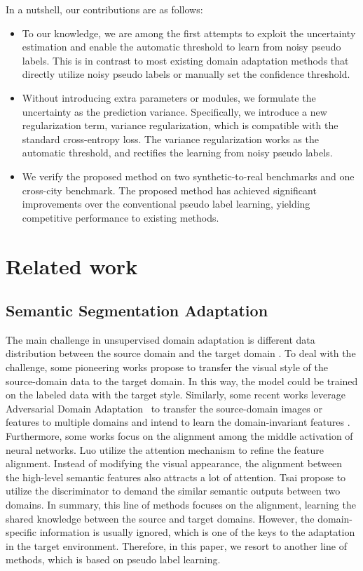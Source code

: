 In a nutshell, our contributions are as follows:
\begin{itemize}
\item To our knowledge, we are among the first attempts to exploit the uncertainty estimation and enable the automatic threshold to learn from noisy pseudo labels. This is in contrast to most existing domain adaptation methods that directly utilize noisy pseudo labels or manually set the confidence threshold. 
\item Without introducing extra parameters or modules, we formulate the uncertainty as the prediction variance. Specifically, we introduce a new regularization term, variance regularization, which is compatible with the standard cross-entropy loss. The variance regularization works as the automatic threshold, and rectifies the learning from noisy pseudo labels.
\item We verify the proposed method on two synthetic-to-real benchmarks and one cross-city benchmark. The proposed method has achieved significant improvements over the conventional pseudo label learning, yielding competitive performance to existing methods.
 \end{itemize}


\section{Related work}
\subsection{Semantic Segmentation Adaptation}
The main challenge in unsupervised domain adaptation is different data distribution between the source domain and the target domain \cite{fu2015transductive,wang2018transferable,li2020csrl,li2020metaparsing,kang2020adversarial}. To deal with the challenge, some pioneering works \cite{hoffman2018cycada,wu2018dcan} propose to transfer the visual style of the source-domain data to the target domain. In this way, the model could be trained on the labeled data with the target style. Similarly, some recent works leverage Adversarial Domain Adaptation~\cite{tzeng2015simultaneous,ganin2015unsupervised,luo2020adversarial} to transfer the source-domain images or features to multiple domains and intend to learn the domain-invariant features \cite{wu2019ace,yue2019domain}. Furthermore, some works focus on the alignment among the middle activation of neural networks. Luo \etal \cite{luo2019significance,luo2019taking} utilize the attention mechanism to refine the feature alignment. Instead of modifying the visual appearance, the alignment between the high-level semantic features also attracts a lot of attention. Tsai \etal \cite{tsai2018learning,tsai2019domain} propose to utilize the discriminator to demand the similar semantic outputs between two domains.
In summary, this line of methods focuses on the alignment, learning the shared knowledge between the source and target domains. However, the domain-specific information is usually ignored, which is one of the keys to the adaptation in the target environment. Therefore, in this paper, we resort to another line of methods, which is based on pseudo label learning.

